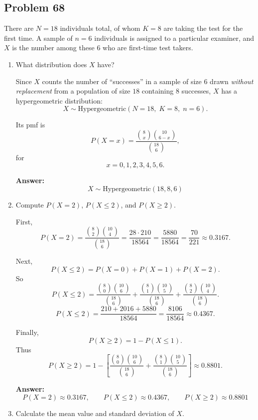 \documentclass[11pt]{article}
\begin{document}
\subsection*{Problem 68}

There are \(N=18\) individuals total, of whom \(K=8\) are taking the test for the first time.  
A sample of \(n=6\) individuals is assigned to a particular examiner, and \(X\) is the number among these \(6\) who are first-time test takers.

\begin{enumerate}
    \item[(a)] What distribution does \(X\) have?

    Since \(X\) counts the number of ``successes'' in a sample of size \(6\) drawn \emph{without replacement} from a population of size \(18\) containing \(8\) successes, \(X\) has a hypergeometric distribution:
    \[
    X \sim \mathrm{Hypergeometric}(N=18,\;K=8,\;n=6).
    \]

    Its pmf is
    \[
    P(X=x)=\frac{\binom{8}{x}\binom{10}{6-x}}{\binom{18}{6}},
    \]
    for
    \[
    x=0,1,2,3,4,5,6.
    \]

    \textbf{Answer:}
    \[
    \boxed{X\sim \mathrm{Hypergeometric}(18,8,6)}
    \]

    \item[(b)] Compute \(P(X=2)\), \(P(X\le 2)\), and \(P(X\ge 2)\).

    First,
    \[
    P(X=2)=\frac{\binom{8}{2}\binom{10}{4}}{\binom{18}{6}}
    =\frac{28\cdot 210}{18564}
    =\frac{5880}{18564}
    =\frac{70}{221}
    \approx 0.3167.
    \]

    Next,
    \[
    P(X\le 2)=P(X=0)+P(X=1)+P(X=2).
    \]
    So
    \[
    P(X\le 2)=
    \frac{\binom{8}{0}\binom{10}{6}}{\binom{18}{6}}
    +
    \frac{\binom{8}{1}\binom{10}{5}}{\binom{18}{6}}
    +
    \frac{\binom{8}{2}\binom{10}{4}}{\binom{18}{6}}.
    \]
    \[
    P(X\le 2)
    =
    \frac{210+2016+5880}{18564}
    =
    \frac{8106}{18564}
    \approx 0.4367.
    \]

    Finally,
    \[
    P(X\ge 2)=1-P(X\le 1).
    \]
    Thus
    \[
    P(X\ge 2)=1-\left[
    \frac{\binom{8}{0}\binom{10}{6}}{\binom{18}{6}}
    +
    \frac{\binom{8}{1}\binom{10}{5}}{\binom{18}{6}}
    \right]
    \approx 0.8801.
    \]

    \textbf{Answer:}
    \[
    \boxed{P(X=2)\approx 0.3167,\qquad P(X\le 2)\approx 0.4367,\qquad P(X\ge 2)\approx 0.8801}
    \]

    \item[(c)] Calculate the mean value and standard deviation of \(X\).


\end{enumerate}
\end{document}
